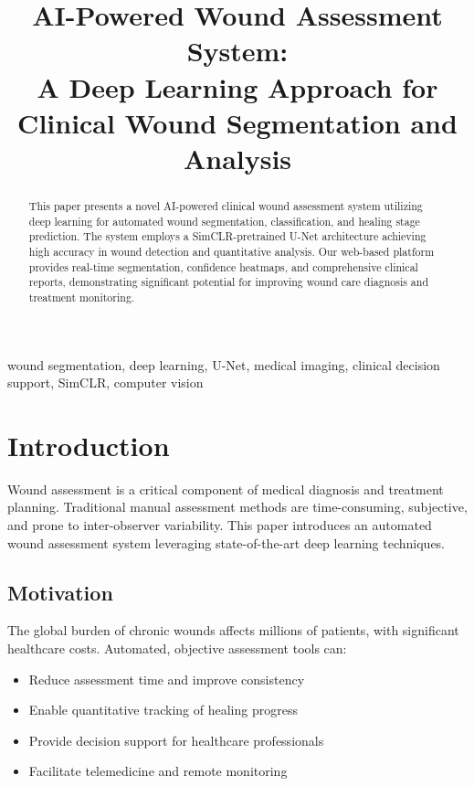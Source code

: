 \documentclass[conference]{IEEEtran}
\begin{document}
\title{AI-Powered Wound Assessment System: \\
A Deep Learning Approach for Clinical Wound Segmentation and Analysis}

\author{
}

\maketitle

\begin{abstract}
This paper presents a novel AI-powered clinical wound assessment system utilizing deep learning for automated wound segmentation, classification, and healing stage prediction. The system employs a SimCLR-pretrained U-Net architecture achieving high accuracy in wound detection and quantitative analysis. Our web-based platform provides real-time segmentation, confidence heatmaps, and comprehensive clinical reports, demonstrating significant potential for improving wound care diagnosis and treatment monitoring.
\end{abstract}

\begin{IEEEkeywords}
wound segmentation, deep learning, U-Net, medical imaging, clinical decision support, SimCLR, computer vision
\end{IEEEkeywords}

\section{Introduction}
Wound assessment is a critical component of medical diagnosis and treatment planning. Traditional manual assessment methods are time-consuming, subjective, and prone to inter-observer variability. This paper introduces an automated wound assessment system leveraging state-of-the-art deep learning techniques.

\subsection{Motivation}
The global burden of chronic wounds affects millions of patients, with significant healthcare costs. Automated, objective assessment tools can:
\begin{itemize}
    \item Reduce assessment time and improve consistency
    \item Enable quantitative tracking of healing progress
    \item Provide decision support for healthcare professionals
    \item Facilitate telemedicine and remote monitoring
\end{itemize}
\end{document}
